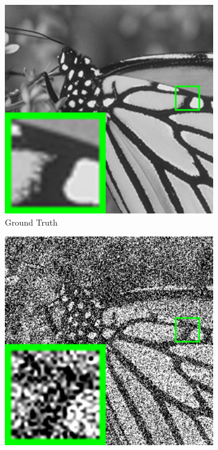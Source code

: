\begin{figure}
\begin{adjustwidth}{-2cm}{}
    \centering
    \begin{subfigure}[t]{0.19\textwidth}
        \centering
        \includegraphics[width=1\textwidth]{images/twsc/awgn/br_monarch.png}
	   \caption{Ground Truth}
    \end{subfigure}
    \hfill
    \begin{subfigure}[t]{0.19\textwidth}
        \centering
        \includegraphics[width=1\textwidth]{images/twsc/awgn/br_100_monarch.png}

\end{subfigure}
\end{adjustwidth}
\end{figure}
